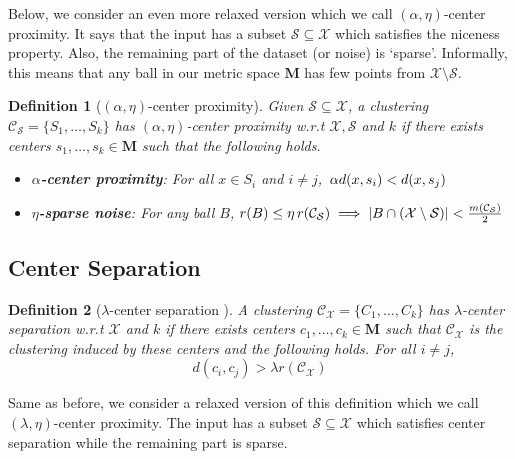 \documentclass[letterpaper,12pt,titlepage,oneside,final]{book}
\newtheorem{definition}{Definition}
\newcommand{\mc}{\mathcal}
\newcommand{\mb}{\mathbf}
\begin{document}
Below, we consider an even more relaxed version which we call $(\alpha, \eta)$-center proximity. It says that the input has a subset $\mc S \subseteq \mc X$ which satisfies the niceness property. Also, the remaining part of the dataset (or noise) is `sparse'. Informally, this means that any ball in our metric space $\mb M$ has few points from $\mc X \setminus \mc S$. 

\begin{definition}[$(\alpha, \eta)$-center proximity]
\label{def:alphaeta}
Given $\mc S \subseteq \mc X$, a clustering $\mc C_{\mc S} = \{S_1, \ldots, S_k\}$ has $(\alpha, \eta)$-center proximity w.r.t $\mc X, \mc S$ and $k$ if there exists centers $s_1, \ldots, s_k \in \mb M$  such that the following holds.

\begin{itemize}
\label{defn:alphacpnoise}	
\item[$\diamond$] {\bf $\alpha$-center proximity}: For all $x \in S_i$ and $i\neq j$, $\thinspace\alpha d(x, s_i) < d(x, s_j)$
\item[$\diamond$]{\bf $\eta$-sparse noise}: For any ball $B$, $r(B)\leq \eta \thinspace r(\mc{C}_{\mc S}) \implies |B\cap (\mc X\setminus \mc S)| < \frac{m(\mc C_{\mc S})}{2}$
\end{itemize}
\end{definition}

\subsection{Center Separation}
\begin{definition}[$\lambda$-center separation \cite{ben2014clustering}]
\label{defn:lambdacs}
A clustering $\mc C_{\mc X} = \{C_1, \ldots, C_k\}$ has $\lambda$-center separation w.r.t $\mc X$ and $k$ if there exists centers $c_1, \ldots, c_k \in \mb M$ such that $\mc C_{\mc X}$ is the clustering induced by these centers and the following holds. For all $i\neq j$, $$d(c_i, c_j) > \lambda r(\mc{C}_{\mc{X}})$$
\end{definition}

Same as before, we consider a relaxed version of this definition which we call $(\lambda, \eta)$-center proximity. The input has a subset $\mc S \subseteq \mc X$ which satisfies center separation while the remaining part is sparse. 
\end{document}
